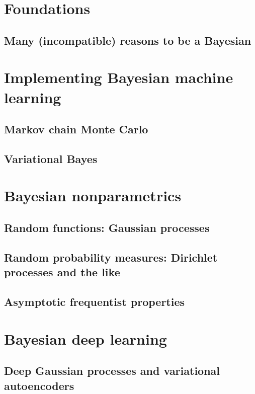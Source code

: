 \documentclass[11pt,fleqn]{book} %
\begin{document}
\part{Foundations}
    \label{ch:foundations}
    \chapter{Many (incompatible) reasons to be a Bayesian}
    

\part{Implementing Bayesian machine learning}
    \chapter{Markov chain Monte Carlo}
    
    \chapter{Variational Bayes}
    

\part{Bayesian nonparametrics}
	\label{ch:bnp}
    \chapter{Random functions: Gaussian processes}
    
    \chapter{Random probability measures: Dirichlet processes and the like}
    
    \chapter{Asymptotic frequentist properties}
    

\part{Bayesian deep learning}
    \chapter{Deep Gaussian processes and variational autoencoders}
    
\end{document}
